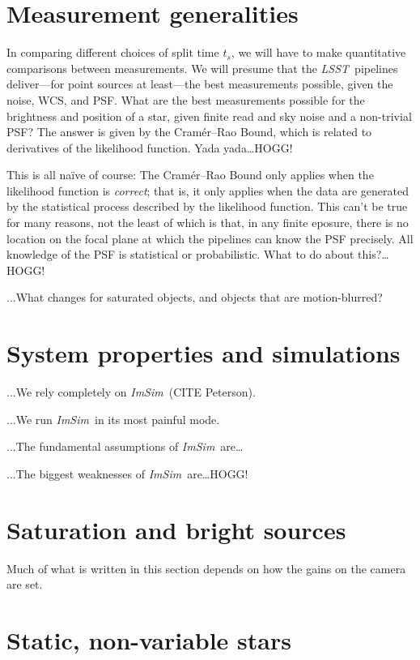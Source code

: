 \documentclass[12pt]{article}
\newcommand{\project}[1]{\textsl{#1}}
\newcommand{\LSST}{\project{LSST}}
\newcommand{\ImSim}{\project{ImSim}}
\begin{document}
\section{Measurement generalities}

In comparing different choices of split time $t_s$, we will have to make
quantitative comparisons between measurements.
We will presume that the \LSST\ pipelines deliver---for point sources at
least---the best measurements possible, given the noise, WCS, and PSF.
What are the best measurements possible for the brightness and position
of a star, given finite read and sky noise and a non-trivial PSF?
The answer is given by the Cram\'er--Rao Bound, which is related to
derivatives of the likelihood function.
Yada yada\ldots HOGG!

This is all na\"ive of course:
The Cram\'er--Rao Bound only applies when the likelihood function is
\emph{correct}; that is, it only applies when the data are generated by
the statistical process described by the likelihood function.
This can't be true for many reasons, not the least of which is that,
in any finite eposure, there is no location on the focal plane at which
the pipelines can know the PSF precisely.
All knowledge of the PSF is statistical or probabilistic.
What to do about this?\ldots HOGG!

...What changes for saturated objects, and objects that are motion-blurred?

\section{System properties and simulations}

...We rely completely on \ImSim\ (CITE Peterson).

...We run \ImSim\ in its most painful mode.

...The fundamental assumptions of \ImSim\ are\ldots

...The biggest weaknesses of \ImSim\ are\ldots HOGG!

\section{Saturation and bright sources}

Much of what is written in this section depends on how the gains on the
camera are set.

\section{Static, non-variable stars}
\end{document}
